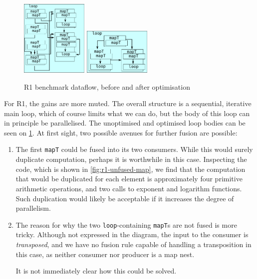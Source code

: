 \begin{figure}
\begin{center}
\includegraphics[width=3.2cm]{img/HiperfitEgCos-unfused.pdf}
\hspace{1cm}
\includegraphics[width=3.2cm]{img/HiperfitEgCos-fused.pdf}
\end{center}
\caption{R1 benchmark dataflow, before and after optimisation}
\label{fig:r1-dataflow}
\end{figure}

For R1, the gains are more muted.  The overall structure is a
sequential, iterative main loop, which of course limits what we can
do, but the body of this loop can in principle be parallelised.  The
unoptimised and optimised loop bodies can be seen on
\cref{fig:r1-dataflow}.  At first sight, two possible avenues for
further fusion are possible:

\begin{enumerate}
\item The first \texttt{mapT} could be fused into its two consumers.
  While this would surely duplicate computation, perhaps it is
  worthwhile in this case.  Inspecting the code, which is shown in
  \cref{fig:r1-unfused-map}, we find that the computation that would
  be duplicated for each element is approximately four primitive
  arithmetic operations, and two calls to exponent and logarithm
  functions.  Such duplication would likely be acceptable if it
  increases the degree of parallelism.

\item The reason for why the two \texttt{loop}-containing
  \texttt{mapT}s are not fused is more tricky.  Although not expressed
  in the diagram, the input to the consumer is \textit{transposed},
  and we have no fusion rule capable of handling a transposition in
  this case, as neither consumer nor producer is a map nest.

  It is not immediately clear how this could be solved.
\end{enumerate}

